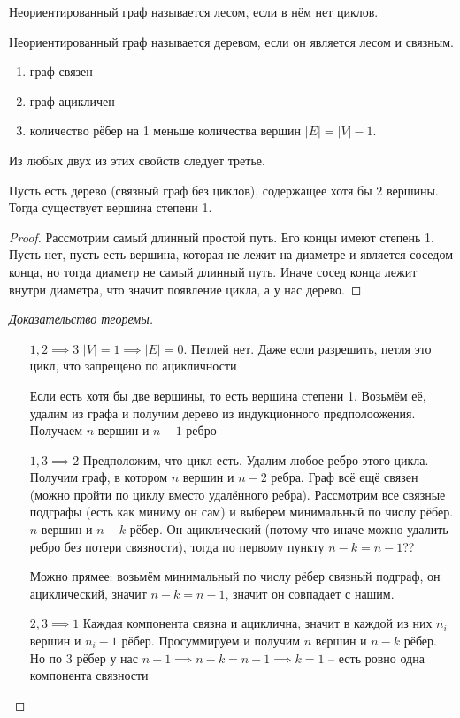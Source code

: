 \documentclass{book}
\theoremstyle{definition}
\begin{document}
    \begin{definition}
        Неориентированный граф называется лесом, если в нём нет циклов.

        Неориентированный граф называется деревом, если он является лесом и связным.
    \end{definition}
    \begin{theorem}
        \begin{enumerate}
            \item граф связен
            \item граф ацикличен
            \item количество рёбер на 1 меньше количества вершин $|E| = |V|-1$.
        \end{enumerate}

        Из любых двух из этих свойств следует третье.
    \end{theorem}
    \begin{lemma}
        Пусть есть дерево (связный граф без циклов), содержащее хотя бы $2$ вершины. Тогда существует вершина степени 1.
    \end{lemma}
    \begin{proof}
        Рассмотрим самый длинный простой путь. Его концы имеют степень 1. Пусть нет, пусть есть вершина, которая не лежит на диаметре и является соседом конца, но тогда диаметр не самый длинный путь. Иначе сосед конца лежит внутри диаметра, что значит появление цикла, а у нас дерево.
    \end{proof}
    \begin{proof}
        [Доказательство теоремы]

       \begin{itemize}
           \item [$1, 2\implies 3$] $|V| = 1 \implies |E| = 0$. Петлей нет. Даже если разрешить, петля это цикл, что запрещено по ацикличности

               Если есть хотя бы две вершины, то есть вершина степени 1. Возьмём её, удалим из графа и получим дерево из индукционного предполоожения. Получаем $n$ вершин и $n-1$ ребро
           \item[$1,3\implies 2$] Предположим, что цикл есть. Удалим любое ребро этого цикла. Получим граф, в котором $n$ вершин и $n-2$ ребра. Граф всё ещё связен (можно пройти по циклу вместо удалённого ребра). Рассмотрим все связные подграфы (есть как миниму он сам) и выберем минимальный по числу рёбер.  $n$ вершин и  $n-k$  рёбер. Он ациклический (потому что иначе можно удалить ребро без потери связности), тогда по первому пункту  $n-k = n-1$??

               Можно прямее: возьмём минимальный по числу рёбер связный подграф, он ациклический, значит $n-k = n-1$, значит он совпадает с нашим.
           \item [$2, 3\implies 1$] Каждая компонента связна и ациклична, значит в каждой из них $n_i$ вершин и  $n_i-1$ рёбер. Просуммируем и получим  $n$ вершин и  $n-k$ рёбер. Но по 3 рёбер у нас  $n-1\implies n-k = n-1 \implies k=1$ -- есть ровно одна компонента связности
       \end{itemize}
    \end{proof}
\end{document}
